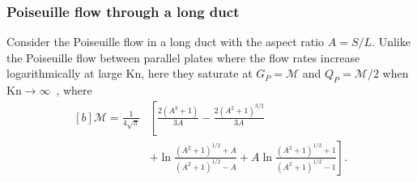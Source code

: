 \subsubsection{Poiseuille flow through a long duct}

Consider the Poiseuille flow in a long duct with the aspect ratio $A=S/L$. Unlike the Poiseuille flow between parallel plates where the flow rates increase logarithmically at large $\text{Kn}$, here they saturate at $G_P=\mathcal{M}$ and $Q_P=\mathcal{M}/2$ when $\text{Kn}\rightarrow\infty$~\cite{loyalka1976}, where 
\begin{equation}\label{Mass_flow_rate_fm}
\begin{aligned}[b]
\mathcal{M}=\frac{1}{4\sqrt{\pi}}&\left[\frac{2(A^3+1)}{3A}-\frac{2(A^2+1)^{3/2}}{3A} \right. \\
&\left.
 +\ln\frac{(A^2+1)^{1/2}+A}{(A^2+1)^{1/2}-A}+A\ln\frac{(A^2+1)^{1/2}+1}{(A^2+1)^{1/2}-1} \right].
\end{aligned}
\end{equation}

